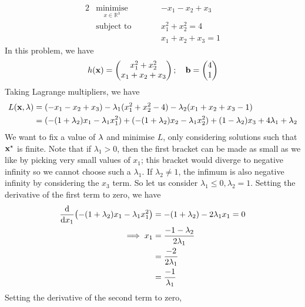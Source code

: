 \begin{example}
	\begin{alignat*}{2}
		 & \underset{x \in \mathbb R^3}{\text{minimise}} & \qquad & -x_1 -x_2 + x_3     \\
		 & \text{subject to}                             &        & x_1^2 + x_2^2 = 4   \\
		 &                                               &        & x_1 + x_2 + x_3 = 1
	\end{alignat*}
	In this problem, we have
	\[
		h(\vb x) = \begin{pmatrix}
			x_1^2 + x_2^2 \\ x_1 + x_2 + x_3
		\end{pmatrix};\quad \vb b = \begin{pmatrix}
			4 \\ 1
		\end{pmatrix}
	\]
	Taking Lagrange multipliers, we have
	\begin{align*}
		L(\vb x, \vb\lambda) & = (-x_1 - x_2 + x_3) - \lambda_1 (x_1^2 + x_2^2 - 4) - \lambda_2(x_1+x_2 + x_3 - 1)                                               \\
		                              & = (-(1+\lambda_2) x_1 - \lambda_1 x_1^2) + (-(1 + \lambda_2)x_2 - \lambda_1 x_2^2) + (1 - \lambda_2)x_3 + 4 \lambda_1 + \lambda_2
	\end{align*}
	We want to fix a value of \(\vb \lambda\) and minimise \(L\), only considering solutions such that \(\vb x^\star\) is finite.
	Note that if \(\lambda_1 > 0\), then the first bracket can be made as small as we like by picking very small values of \(x_1\); this bracket would diverge to negative infinity so we cannot choose such a \(\lambda_1\).
	If \(\lambda_2 \neq 1\), the infimum is also negative infinity by considering the \(x_3\) term.
	So let us consider \(\lambda_1 \leq 0, \lambda_2 = 1\).
	Setting the derivative of the first term to zero, we have
	\begin{align*}
		\dv{x_1} (-(1+\lambda_2) x_1 - \lambda_1 x_1^2) & = -(1+\lambda_2) - 2 \lambda_1 x_1 = 0 \\
		\implies x_1                                    & = \frac{-1 - \lambda_2}{2\lambda_1}    \\
		                                                & = \frac{-2}{2\lambda_1}                \\
		                                                & = \frac{-1}{\lambda_1}
	\end{align*}
	Setting the derivative of the second term to zero,

\end{example}
